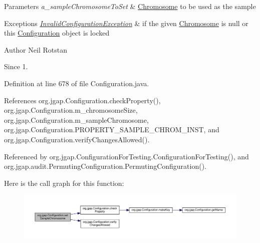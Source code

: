 \begin{DoxyParams}{Parameters}
{\em a\-\_\-sample\-Chromosome\-To\-Set} & \hyperlink{classorg_1_1jgap_1_1_chromosome}{Chromosome} to be used as the sample \\
\hline
\end{DoxyParams}

\begin{DoxyExceptions}{Exceptions}
{\em \hyperlink{classorg_1_1jgap_1_1_invalid_configuration_exception}{Invalid\-Configuration\-Exception}} & if the given \hyperlink{classorg_1_1jgap_1_1_chromosome}{Chromosome} is null or this \hyperlink{classorg_1_1jgap_1_1_configuration}{Configuration} object is locked\\
\hline
\end{DoxyExceptions}
\begin{DoxyAuthor}{Author}
Neil Rotstan 
\end{DoxyAuthor}
\begin{DoxySince}{Since}
1. 
\end{DoxySince}


Definition at line 678 of file Configuration.\-java.



References org.\-jgap.\-Configuration.\-check\-Property(), org.\-jgap.\-Configuration.\-m\-\_\-chromosome\-Size, org.\-jgap.\-Configuration.\-m\-\_\-sample\-Chromosome, org.\-jgap.\-Configuration.\-P\-R\-O\-P\-E\-R\-T\-Y\-\_\-\-S\-A\-M\-P\-L\-E\-\_\-\-C\-H\-R\-O\-M\-\_\-\-I\-N\-S\-T, and org.\-jgap.\-Configuration.\-verify\-Changes\-Allowed().



Referenced by org.\-jgap.\-Configuration\-For\-Testing.\-Configuration\-For\-Testing(), and org.\-jgap.\-audit.\-Permuting\-Configuration.\-Permuting\-Configuration().



Here is the call graph for this function\-:
\nopagebreak
\begin{figure}[H]
\begin{center}
\leavevmode
\includegraphics[width=350pt]{classorg_1_1jgap_1_1_configuration_aac3d89beeb81bad3412a20aa6b0f15d6_cgraph}
\end{center}
\end{figure}


